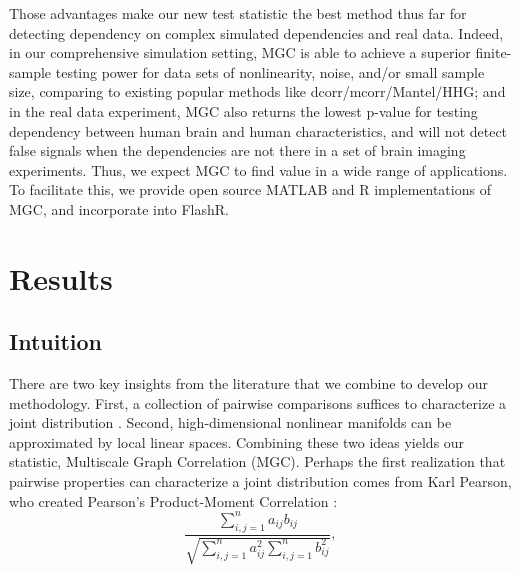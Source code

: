 \documentclass[11pt]{article}
\begin{document}
Those advantages make our new test statistic the best method thus far for detecting dependency on complex simulated dependencies and real data. Indeed, in our comprehensive simulation setting, MGC is able to achieve a superior finite-sample testing power for data sets of nonlinearity, noise, and/or small sample size, comparing to existing popular methods like dcorr/mcorr/Mantel/HHG; and in the real data experiment, MGC also returns the lowest p-value for testing dependency between human brain and human characteristics,  and will not detect false signals when the dependencies are not there in a set of brain imaging experiments. Thus, we expect MGC to find value in a wide range of applications.  To facilitate this, we provide open source MATLAB and R implementations of MGC, and incorporate into FlashR.


\section{Results}

\subsection{Intuition}

There are two key insights from the literature that we combine to develop our methodology.  First, a collection of pairwise comparisons  suffices to characterize a joint distribution \cite{Maa1996}.  Second, high-dimensional nonlinear manifolds can be approximated by local linear spaces.  Combining these two ideas yields our statistic,  Multiscale Graph Correlation (MGC).  Perhaps the first realization that pairwise properties can characterize a joint distribution comes from  Karl Pearson, who created Pearson's Product-Moment Correlation \cite{Pearson1895}:
\begin{equation}
\label{generalCoef}
\frac{\sum_{i,j=1}^n a_{ij} b_{ij}}{\sqrt{\sum_{i,j=1}^n  a_{ij}^{2} \sum_{i,j=1}^n b_{ij}^{2}}}, 
\end{equation}
\end{document}
